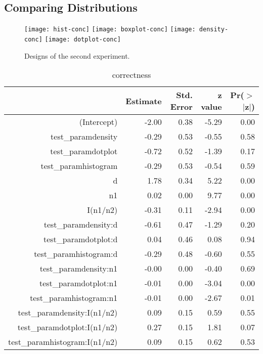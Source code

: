 \subsection{Comparing Distributions}

\begin{figure*} [hbtp]
   \centering
   \texttt{[image: hist-conc]} 
   \texttt{[image: boxplot-conc]} 
   \texttt{[image: density-conc]} 
   \texttt{[image: dotplot-conc]} 
   \caption{Designs of the second experiment.}
   \label{fig:expii}
\end{figure*}

\begin{table}[ht]
\begin{center}
\begin{tabular}{rrrrr}
  \hline
 & Estimate & Std. Error & z value & Pr($>$$|$z$|$) \\ 
  \hline
(Intercept) & -2.00 & 0.38 & -5.29 & 0.00 \\ 
  test\_paramdensity & -0.29 & 0.53 & -0.55 & 0.58 \\ 
  test\_paramdotplot & -0.72 & 0.52 & -1.39 & 0.17 \\ 
  test\_paramhistogram & -0.29 & 0.53 & -0.54 & 0.59 \\ 
  d & 1.78 & 0.34 & 5.22 & 0.00 \\ 
  n1 & 0.02 & 0.00 & 9.77 & 0.00 \\ 
  I(n1/n2) & -0.31 & 0.11 & -2.94 & 0.00 \\ 
  test\_paramdensity:d & -0.61 & 0.47 & -1.29 & 0.20 \\ 
  test\_paramdotplot:d & 0.04 & 0.46 & 0.08 & 0.94 \\ 
  test\_paramhistogram:d & -0.29 & 0.48 & -0.60 & 0.55 \\ 
  test\_paramdensity:n1 & -0.00 & 0.00 & -0.40 & 0.69 \\ 
  test\_paramdotplot:n1 & -0.01 & 0.00 & -3.04 & 0.00 \\ 
  test\_paramhistogram:n1 & -0.01 & 0.00 & -2.67 & 0.01 \\ 
  test\_paramdensity:I(n1/n2) & 0.09 & 0.15 & 0.59 & 0.55 \\ 
  test\_paramdotplot:I(n1/n2) & 0.27 & 0.15 & 1.81 & 0.07 \\ 
  test\_paramhistogram:I(n1/n2) & 0.09 & 0.15 & 0.62 & 0.53 \\ 
   \hline
\end{tabular}
\end{center}
\caption{correctness}
\end{table}

